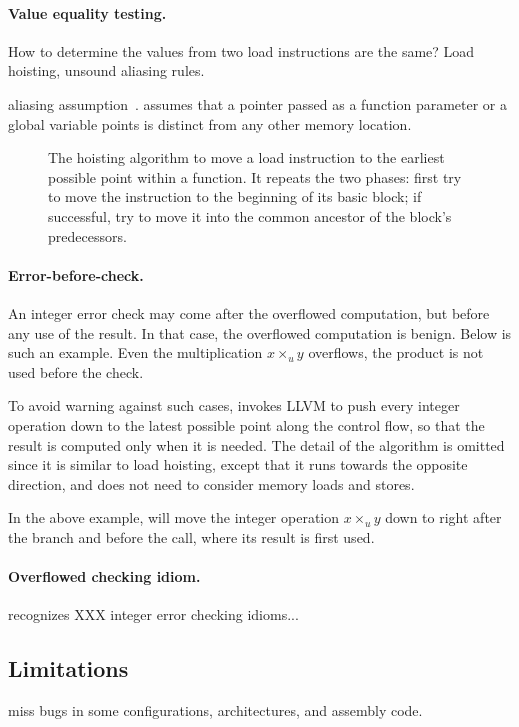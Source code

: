 \paragraph{Value equality testing.}
How to determine the values from two load instructions
are the same? Load hoisting, unsound aliasing rules.


aliasing assumption~\cite{livshits:ipssa}.
\sys assumes that a pointer passed as a function parameter or a
global variable points is distinct from any other memory location.


\begin{figure}

\caption{The hoisting algorithm to move a load instruction to the
earliest possible point within a function.  It repeats the two
phases: first try to move the instruction to the beginning of its
basic block; if successful, try to move it into the common ancestor
of the block's predecessors.}
\label{f:hoist}
\end{figure}
\fi

\paragraph{Error-before-check.}
An integer error check may come after the overflowed computation,
but before any use of the result.  In that case, the overflowed
computation is benign.  Below is such an example.  Even the
multiplication $x \times_u y$ overflows, the product  is
not used before the check.


To avoid warning against such cases, \sys invokes LLVM to push every
integer operation down to the latest possible point along the control
flow, so that the result is computed only when it is needed.  The
detail of the algorithm is omitted since it is similar to load
hoisting, except that it runs towards the opposite direction, and
does not need to consider memory loads and stores.

In the above example, \sys will move the integer operation $x
\times_u y$ down to right after the  branch and before the
 call, where its result  is first used.

\paragraph{Overflowed checking idiom.}

\sys recognizes XXX integer error checking idioms...

\subsection{Limitations}

miss bugs in some configurations, architectures,
and assembly code.

